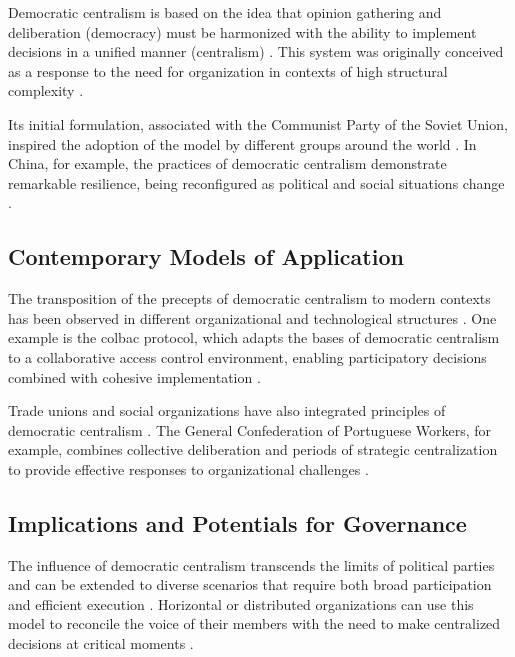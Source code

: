 Democratic centralism is based on the idea that opinion gathering and
deliberation (democracy) must be harmonized with the ability to implement
decisions in a unified manner (centralism)
\cite{ACenturyofDemocraticCentralism}. This system was originally conceived as a
response to the need for organization in contexts of high structural complexity
\cite{StillaCenturyoftheChineseModel,EstatutosDoPCP}.

Its initial formulation, associated with the Communist Party of the Soviet
Union, inspired the adoption of the model by different groups around the world
\cite{EstatutosDoPCP}. In China, for example, the practices of democratic
centralism demonstrate remarkable resilience, being reconfigured as political
and social situations change \cite{ACenturyofDemocraticCentralism}.

\subsection{Contemporary Models of Application}
\label{subsec:contemporary_models_application}

The transposition of the precepts of democratic centralism to modern contexts
has been observed in different organizational and technological structures
\cite{DoArtifactsHavePolitics, Colbac}. One example is the \gls{colbac}
protocol, which adapts the bases of democratic centralism to a collaborative
access control environment, enabling participatory decisions combined with
cohesive implementation \cite{Colbac}.

Trade unions and social organizations have also integrated principles of
democratic centralism \cite{CGTPStatutes}. The General Confederation of
Portuguese Workers, for example, combines collective deliberation and periods of
strategic centralization to provide effective responses to organizational
challenges \cite{CGTPStatutes}.

\subsection{Implications and Potentials for Governance}
\label{subsec:implications_potentials_governance}

The influence of democratic centralism transcends the limits of political
parties and can be extended to diverse scenarios that require both broad
participation and efficient execution \cite{ACenturyofDemocraticCentralism,
TheCostsofConnection}. Horizontal or distributed organizations can use this
model to reconcile the voice of their members with the need to make centralized
decisions at critical moments
\cite{StillaCenturyoftheChineseModel,ACenturyofDemocraticCentralism}.

